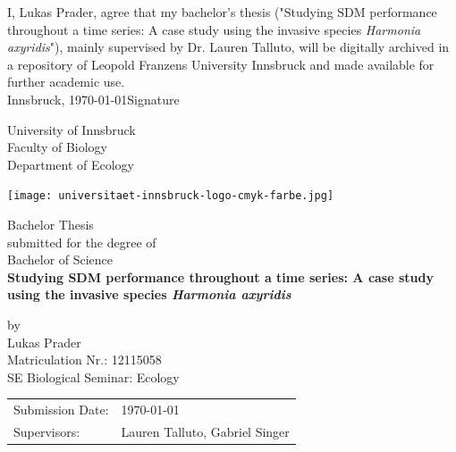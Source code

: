 \documentclass[12pt,a4paper]{article}
\begin{document}
\def\findate{\today}


\thispagestyle{empty}
I, Lukas Prader, agree that my bachelor's thesis ("Studying SDM performance throughout a time series: A case study using the invasive species \textit{Harmonia axyridis}"), mainly supervised by Dr. Lauren Talluto, will be digitally archived in a repository of Leopold Franzens University Innsbruck and made available for further academic use. \\

Innsbruck, \findate					\hfill Signature

\newpage
\thispagestyle{empty}
\begin{center}
    \Large{University of Innsbruck \\ Faculty of Biology} \\
    \vspace{3mm}
    \large{Department of Ecology}
    \vspace{10mm}

    \texttt{[image: universitaet-innsbruck-logo-cmyk-farbe.jpg]}

    \vspace{10mm}
    \Large{Bachelor Thesis} \\
    \large{submitted for the degree of} \\
    \Large{Bachelor of Science} \\
    \vspace{10mm}
    \LARGE{\textbf{Studying SDM performance throughout a time series: A case study using the invasive species \textit{Harmonia axyridis}}} \\
    \vspace{10mm}

    \large{by \\ Lukas Prader \\ Matriculation Nr.: 12115058 \\ SE Biological Seminar: Ecology}
\end{center}

\vspace{30mm}
\begin{tabular}{ll}
    \large{Submission Date:} & \large{\findate}                       \\
    \large{Supervisors:}     & \large{Lauren Talluto, Gabriel Singer} \\
\end{tabular}
\end{document}
